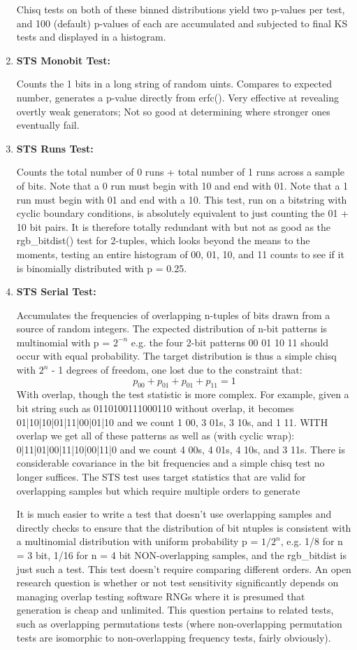 \documentclass[titlepage, 11pt]{article}
\begin{document}
\begin{enumerate}
Chisq tests on both of these binned distributions yield two p-values per test,
and 100 (default) p-values of each are accumulated and subjected to
final KS tests and displayed in a histogram.


\item \textbf{STS Monobit Test:}


Counts the 1 bits in a long string of random uints.
Compares to expected number, generates a p-value directly from
erfc(). Very effective at revealing overtly weak generators;
Not so good at determining where stronger ones eventually fail.


\item \textbf{STS Runs Test:}


Counts the total number of 0 runs + total number of 1 runs across
a sample of bits.  Note that a 0 run must begin with 10 and end
with 01. Note that a 1 run must begin with 01 and end with a 10.
This test, run on a bitstring with cyclic boundary conditions, is
absolutely equivalent to just counting the 01 + 10 bit pairs.
It is therefore totally redundant with but not as good as the
rgb\_bitdist() test for 2-tuples, which looks beyond the means to the
moments, testing an entire histogram  of 00, 01, 10, and 11 counts
to see if it is binomially distributed with p = 0.25.


\item \textbf{STS Serial Test:} 


Accumulates the frequencies of overlapping n-tuples of bits drawn
from a source of random integers.  The expected distribution of n-bit
patterns is multinomial with p = $2^{-n}$ e.g. the four 2-bit patterns
   00 01 10 11
should occur with equal probability.  The target distribution is thus
a simple chisq with $2^n$ - 1 degrees of freedom, one lost due to the
constraint that:
        $$p_{00} + p_{01} + p_{01} + p_{11} = 1$$
With overlap, though the test statistic is more complex.  For example,
given a bit string such as 0110100111000110 without overlap, it becomes
01|10|10|01|11|00|01|10 and we count 1 00, 3 01s, 3 10s, and 1 11.
WITH overlap we get all of these patterns as well as (with cyclic wrap):
0|11|01|00|11|10|00|11|0 and we count 4 00s, 4 01s, 4 10s, and 3 11s.
There is considerable covariance in the bit frequencies and a simple
chisq test no longer suffices.  The STS test uses target statistics that
are valid for overlapping samples but which require multiple orders
to generate


It is much easier to write a test that doesn't use overlapping samples
and directly checks to ensure that the distribution of bit ntuples
is consistent with a multinomial distribution with uniform probability
p = $1/2^n$, e.g. 1/8 for n = 3 bit, 1/16 for n = 4 bit NON-overlapping
samples, and the rgb\_bitdist is just such a test.  This test doesn't
require comparing different orders.  An open research question is
whether or not test sensitivity significantly depends on managing
overlap testing software RNGs where it is presumed that generation
is cheap and unlimited.  This question pertains to related tests, such
as overlapping permutations tests (where non-overlapping permutation
tests are isomorphic to non-overlapping frequency tests, fairly
obviously).



\end{enumerate}
\end{document}
